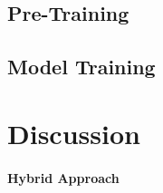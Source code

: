 \documentclass{article}
\begin{document}
        \subsection{Pre-Training}

        \subsection{Model Training}

	\section{Discussion}

        \paragraph{Hybrid Approach}
\end{document}
